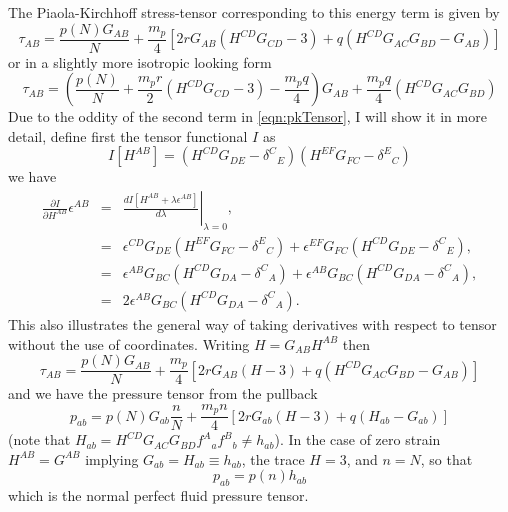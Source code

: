The Piaola-Kirchhoff stress-tensor corresponding to this energy term is given by
\begin{equation}
\label{eqn:pkTensor}
\tau_{AB} = \frac{p(N)G_{AB}}{N} +
\frac{m_p}{4}\left[2rG_{AB}\left(H^{CD}G_{CD}-3\right) + q\left(H^{CD}G_{AC}G_{BD} - G_{AB}\right)\right]
\end{equation}
or in a slightly more isotropic looking form
\begin{equation}
\label{eqn:pkTensorIso}
\tau_{AB} = \left(\frac{p(N)}{N} +
\frac{m_pr}{2}\left(H^{CD}G_{CD}-3\right)-\frac{m_pq}{4}\right)G_{AB} +
\frac{m_pq}{4}\left(H^{CD}G_{AC}G_{BD}\right)
\end{equation}
Due to the oddity of the second term in \eqref{eqn:pkTensor}, I will show it in more detail, define first the tensor functional $I$ as
\begin{equation}
I[H^{AB}] = \left(H^{CD}G_{DE} - \delta^{C}{}_E\right)\left(H^{EF}G_{FC} - \delta^{E}{}_C\right)
\end{equation}
we have
\begin{eqnarray}
\frac{\partial I}{\partial H^{AB}}\epsilon^{AB} & =& \left.\frac{dI\left[H^{AB}+\lambda\epsilon^{AB}\right]}{d\lambda}\right|_{\lambda = 0}, \\
 & = & \epsilon^{CD}G_{DE}\left(H^{EF}G_{FC} - \delta^{E}{}_C\right) + \epsilon^{EF}G_{FC}\left(H^{CD}G_{DE} - \delta^{C}{}_E\right), \\
 & = & \epsilon^{AB}G_{BC}\left(H^{CD}G_{DA} - \delta^{C}{}_A\right) + \epsilon^{AB}G_{BC}\left(H^{CD}G_{DA} - \delta^{C}{}_A\right), \\
 & = & 2\epsilon^{AB}G_{BC}\left(H^{CD}G_{DA} - \delta^{C}{}_A\right).
\end{eqnarray}
This also illustrates the general way of taking derivatives with respect to tensor without the use of coordinates. Writing $H=G_{AB}H^{AB}$ then
\begin{equation}
\tau_{AB} = \frac{p(N)G_{AB}}{N} +
\frac{m_p}{4}\left[2rG_{AB}\left(H-3\right) + q\left(H^{CD}G_{AC}G_{BD} - G_{AB}\right)\right]
\end{equation}
and we have the pressure tensor from the pullback
\begin{equation}
p_{ab} = p(N)G_{ab}\frac{n}{N} +
\frac{m_pn}{4}\left[2rG_{ab}\left(H-3\right) + q\left(H_{ab} - G_{ab}\right)\right]
\end{equation}
(note that $H_{ab} = H^{CD}G_{AC}G_{BD} f^A{}_af^B{}_b \neq h_{ab}$). In the case of zero strain $H^{AB} = G^{AB}$ implying $G_{ab} = H_{ab}\equiv h_{ab}$, the trace $H=3$, and $n=N$, so that
\begin{equation}
p_{ab} = p(n)h_{ab}
\end{equation}
which is the normal perfect fluid pressure tensor.

